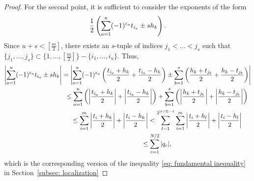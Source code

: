 \documentclass[pdftex]{sigma}
\numberwithin{equation}{section}
\begin{document}
\begin{proof}
For the second point, it is suf\/f\/icient to consider the exponents of the form
 \begin{gather*}{1\over 2}\left(\sum_{a=1}^u (-1)^{\varepsilon_a}t_{i_a}\pm sh_k\right).\end{gather*}
Since $u+s<[\frac{m}{2}]$, there exists an $s$-tuple of indices $j_1<\dots < j_s$ such that $\{j_1,\dots, j_s\}\subset \{1,\dots,[\frac{m}{2}]\}-\{i_1,\dots,i_u\}$. Thus,
 \begin{gather*}
 \left\vert\sum_{a=1}^u (-1)^{\varepsilon_a}t_{i_a}\pm sh_k\right\vert =
 \left\vert\sum_{a=1}^u (-1)^{\varepsilon_a}\left({t_{i_a}+h_k\over 2}+{t_{i_a}-h_k\over 2}\right)
 \pm \sum_{b=1}^s \left({h_k+t_{j_b}\over 2}+{h_k-t_{j_b}\over 2}\right) \right\vert\\
 \hphantom{\left\vert\sum_{a=1}^u (-1)^{\varepsilon_a}t_{i_a}\pm sh_k\right\vert}{}
 \leq\sum_{a=1}^u
 \left(\left\vert{t_{i_a}+h_k\over 2}\right\vert+\left\vert{t_{i_a}-h_k\over 2}\right\vert\right)
 + \sum_{b=1}^s \left(\left\vert{h_k+t_{j_b}\over 2}\right\vert+\left\vert{h_k-t_{j_b}\over 2}\right\vert\right)\\
\hphantom{\left\vert\sum_{a=1}^u (-1)^{\varepsilon_a}t_{i_a}\pm sh_k\right\vert}{} \leq\sum_{i=1}^m
 \left|{t_{i}+h_k\over 2}\right|+\left|{t_{i}-h_k\over 2}\right|
<\sum_{l=1}^{2^{[r/2]-1}}\sum_{i=1}^m
 \left|{t_{i}+h_l\over 2}\right|+\left|{t_{i}-h_l\over 2}\right|\\
\hphantom{\left\vert\sum_{a=1}^u (-1)^{\varepsilon_a}t_{i_a}\pm sh_k\right\vert}{} \leq \sum_{c=1}^{N/2} |q_c|,
 \end{gather*}
which is the corresponding version of the inequality \eqref{eq: fundamental inequality} in Section~\ref{subsec: localization}
\end{proof}
\end{document}
